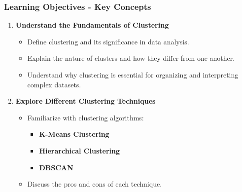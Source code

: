 \documentclass{beamer}
\begin{document}
\begin{frame}[fragile]
    \frametitle{Learning Objectives - Key Concepts}
    \begin{enumerate}
        \item \textbf{Understand the Fundamentals of Clustering}
            \begin{itemize}
                \item Define clustering and its significance in data analysis.
                \item Explain the nature of clusters and how they differ from one another.
                \item Understand why clustering is essential for organizing and interpreting complex datasets.
            \end{itemize}
        \item \textbf{Explore Different Clustering Techniques}
            \begin{itemize}
                \item Familiarize with clustering algorithms:
                    \begin{itemize}
                        \item \textbf{K-Means Clustering}
                        \item \textbf{Hierarchical Clustering}
                        \item \textbf{DBSCAN}
                    \end{itemize}
                \item Discuss the pros and cons of each technique.
            \end{itemize}
    \end{enumerate}
\end{frame}
\end{document}

